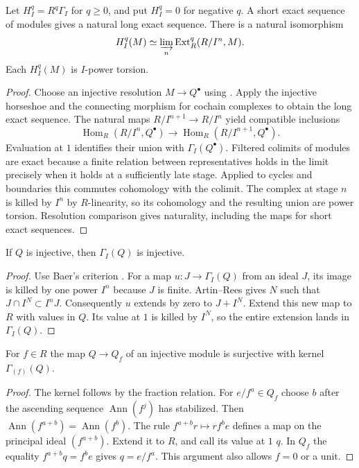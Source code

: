 \begin{theorem}\label{res:L02}
Let \(H_I^q=R^q\Gamma_I\) for \(q\geq0\), and put \(H_I^q=0\) for
negative \(q\). A short exact sequence of modules gives a natural long
exact sequence. There is a natural isomorphism
\[
 H_I^q(M)\simeq\varinjlim_{n}\operatorname{Ext}_R^q(R/I^n,M).
\]
Each \(H_I^q(M)\) is \(I\)-power torsion.
\end{theorem}
\begin{proof}
Choose an injective resolution \(M\to Q^\bullet\) using
\cite[ALG-03-C02-S03]{p103}. Apply the injective horseshoe and the
connecting morphism for cochain complexes to obtain the long exact
sequence. The natural maps \(R/I^{n+1}\to R/I^n\) yield compatible
inclusions
\[
 \operatorname{Hom}_R(R/I^n,Q^\bullet)
   \longrightarrow \operatorname{Hom}_R(R/I^{n+1},Q^\bullet).
\]
Evaluation at \(1\) identifies their union with \(\Gamma_I(Q^\bullet)\).
Filtered colimits of modules are exact because a finite relation between
representatives holds in the limit precisely when it holds at a sufficiently
late stage. Applied to cycles and boundaries this commutes cohomology
with the colimit. The complex at stage \(n\) is killed by \(I^n\) by
\(R\)-linearity, so its cohomology and the resulting union are power
torsion. Resolution comparison gives naturality, including the maps
for short exact sequences.
\end{proof}

\begin{lemma}\label{res:L03}
If \(Q\) is injective, then \(\Gamma_I(Q)\) is injective.
\end{lemma}
\begin{proof}
Use Baer's criterion \cite[ALG-03-C02-R03]{p103}. For a map
\(u:J\to\Gamma_I(Q)\) from an ideal \(J\), its image is killed by one
power \(I^n\) because \(J\) is finite. Artin--Rees
\cite[ALG-05-C04-R02]{p103} gives \(N\) such that
\(J\cap I^N\subset I^nJ\). Consequently \(u\) extends by zero to
\(J+I^N\). Extend this new map to \(R\) with values in \(Q\).
Its value at \(1\) is killed by \(I^N\), so the entire extension lands
in \(\Gamma_I(Q)\).
\end{proof}

\begin{lemma}\label{res:L04}
For \(f\in R\) the map \(Q\to Q_f\) of an injective module is surjective
with kernel \(\Gamma_{(f)}(Q)\).
\end{lemma}
\begin{proof}
The kernel follows by the fraction relation. For \(e/f^a\in Q_f\) choose
\(b\) after the ascending sequence \(\operatorname{Ann}(f^j)\) has
stabilized. Then \(\operatorname{Ann}(f^{a+b})=\operatorname{Ann}(f^b)\).
The rule \(f^{a+b}r\mapsto rf^b e\) defines a map on the principal ideal
\((f^{a+b})\). Extend it to \(R\), and call its value at \(1\) \(q\).
In \(Q_f\) the equality \(f^{a+b}q=f^b e\) gives \(q=e/f^a\).
This argument also allows \(f=0\) or a unit.
\end{proof}

